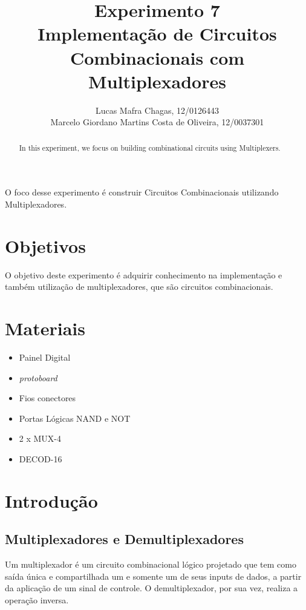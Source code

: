 \documentclass[12pt]{article}
\title{Experimento 7\\ 
	Implementação de Circuitos Combinacionais com Multiplexadores}
\author{
	Lucas Mafra Chagas, 12/0126443 \\
	Marcelo Giordano Martins Costa de Oliveira,  12/0037301
}
\begin{document}
 

\maketitle

 \begin{abstract}
	 In this experiment, we focus on building combinational circuits using Multiplexers.
 \end{abstract}  
 \begin{resumo} 
	O foco desse experimento é construir Circuitos Combinacionais utilizando Multiplexadores.
 \end{resumo}
\section{Objetivos}
\label{sec:Objetivos}

O objetivo deste experimento é adquirir conhecimento na implementação e também utilização de multiplexadores, que são circuitos combinacionais.

\section{Materiais} 
\label{sec:Materiais}

\begin{itemize}						 							
    \item Painel Digital
 
    \item \textit{protoboard}
    
    \item Fios conectores
    
    \item Portas Lógicas NAND e NOT
    
	\item 2 x MUX-4
	
	\item DECOD-16
    
\end{itemize}


\section{Introdução}
\label{sec:Introducao}
\subsection{Multiplexadores e Demultiplexadores}
Um multiplexador é um circuito combinacional lógico projetado que tem como saída única e compartilhada um e somente um de seus inputs de dados, a partir da aplicação de um sinal de controle. O demultiplexador, por sua vez, realiza a operação inversa.
\end{document}
